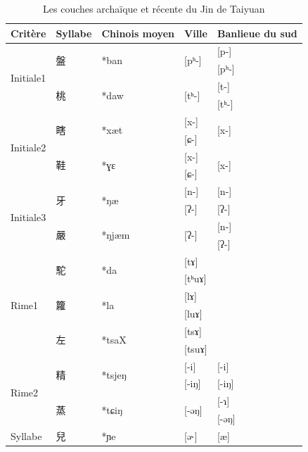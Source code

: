 \documentclass{scrbook}
\newcounter{c}[subsubsection]
\newcommand{\difwenbai}{couches archaïque et récente\xspace}
\begin{document}
\begin{sloppypar}
\begin{table}[htbp]
  \centering
    \begin{tabular}{lllll}
    \toprule
    Critère & Syllabe & Chinois moyen  & Ville & Banlieue du sud \\
    \midrule
    \multirow{4}[2]{*}{Initiale1} & \multirow{2}[1]{*}{盤} & \multirow{2}[1]{*}{*ban} & \multirow{2}[1]{*}{[pʰ-]} & [p-] \\
          &       &       &       & [pʰ-] \\
          & \multirow{2}[1]{*}{桃} & \multirow{2}[1]{*}{*daw} & \multirow{2}[1]{*}{[tʰ-]} & [t-] \\
          &       &       &       & [tʰ-] \\
    \midrule
    \multirow{4}[2]{*}{Initiale2} & \multirow{2}[1]{*}{瞎} & \multirow{2}[1]{*}{*xæt} & [x-]  & \multirow{2}[1]{*}{[x-]} \\
          &       &       & [ɕ-]  &  \\
          & \multirow{2}[1]{*}{鞋} & \multirow{2}[1]{*}{*ɣɛ} & [x-]  & \multirow{2}[1]{*}{[x-]} \\
          &       &       & [ɕ-]  &  \\
    \midrule
    \multirow{4}[2]{*}{Initiale3} & \multirow{2}[1]{*}{牙} & \multirow{2}[1]{*}{*ŋæ} & [n-]  & [n-] \\
          &       &       & [ʔ-]  & [ʔ-] \\
          & \multirow{2}[1]{*}{嚴} & \multirow{2}[1]{*}{*ŋjæm} & \multirow{2}[1]{*}{[ʔ-]} & [n-] \\
          &       &       &       & [ʔ-] \\
    \midrule
    \multirow{6}[2]{*}{Rime1} & \multirow{2}[1]{*}{駝} & \multirow{2}[1]{*}{*da} & [tɤ]  &  \\
          &       &       & [tʰuɤ] &  \\
          & \multirow{2}[0]{*}{籮} & \multirow{2}[0]{*}{*la} & [lɤ]  &  \\
          &       &       & [luɤ] &  \\
          & \multirow{2}[1]{*}{左} & \multirow{2}[1]{*}{*tsaX} & [tsɤ] &  \\
          &       &       & [tsuɤ] &  \\
    \midrule
    \multirow{4}[2]{*}{Rime2} & \multirow{2}[1]{*}{精} & \multirow{2}[1]{*}{*tsjeŋ} & [-i]  & [-i] \\
          &       &       & [-iŋ] & [-iŋ] \\
          & \multirow{2}[1]{*}{蒸} & \multirow{2}[1]{*}{*tɕiŋ} & \multirow{2}[1]{*}{[-əŋ]} & [-ɿ] \\
          &       &       &       & [-əŋ] \\
    \midrule
    Syllabe & 兒     & *ɲe   & [ə˞]  & [æ] \\
    \bottomrule
    \end{tabular}%
  \caption{Les \difwenbai du Jin de Taiyuan}
  \label{tab:Taiyuan1}%
\end{table}%


\end{sloppypar}
\end{document}

